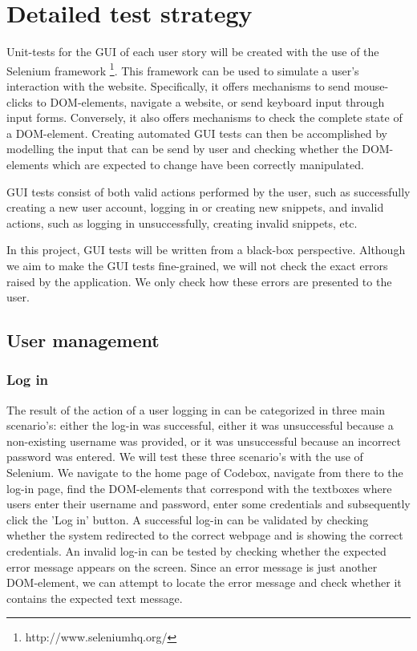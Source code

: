 \documentclass[10pt,a4paper,BCOR12mm, headexclude, footexclude,
  twoside, openright]{scrartcl}
\numberwithin{equation}{section} %
\numberwithin{figure}{section} %
\numberwithin{table}{section} %
\begin{document}
\pagestyle{plain}

\section{Detailed test strategy}

Unit-tests for the GUI of each user story will be created with the use of the Selenium framework \footnote{http://www.seleniumhq.org/}.
This framework can be used to simulate a user's interaction with the website. Specifically, it offers mechanisms to send mouse-clicks to DOM-elements, navigate a website, or send keyboard input through input forms.
Conversely, it also offers mechanisms to check the complete state of a DOM-element.
Creating automated GUI tests can then be accomplished by modelling the input that can be send by user and checking whether the DOM-elements which are expected to change have been correctly manipulated.

GUI tests consist of both valid actions performed by the user, such as successfully creating a new user account, logging in or creating new snippets, and invalid actions, such as logging in unsuccessfully, creating invalid snippets, etc.

In this project, GUI tests will be written from a black-box perspective. Although we aim to make the GUI tests fine-grained, we will not check the exact errors raised by the application. We only check how these errors are presented to the user.

\subsection{User management}

\subsubsection*{Log in}
The result of the action of a user logging in can be categorized in three main scenario's: either the log-in was successful, either it was unsuccessful because a non-existing username was provided, or it was unsuccessful because an incorrect password was entered.
We will test these three scenario's with the use of Selenium.
We navigate to the home page of Codebox, navigate from there to the log-in page, find the DOM-elements that correspond with the textboxes where users enter their username and password, enter some credentials and subsequently click the 'Log in' button.
A successful log-in can be validated by checking whether the system redirected to the correct webpage and is showing the correct credentials.
An invalid log-in can be tested by checking whether the expected error message appears on the screen.
Since an error message is just another DOM-element, we can attempt to locate the error message and check whether it contains the expected text message.
\end{document}
